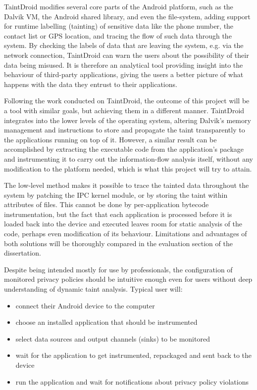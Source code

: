 \documentclass[12pt]{article}
\begin{document}
TaintDroid modifies several core parts of the Android platform, such as 
the Dalvik VM, the Android shared library, and even the file-system, 
adding support for runtime labelling (tainting) of sensitive data like the 
phone number, the contact list or GPS location, and tracing the flow of such 
data through the system. By checking the labels of data that are leaving the 
system, e.g. via the network connection, TaintDroid can warn the users about 
the possibility of their data being misused. It is therefore an analytical 
tool providing insight into the behaviour of third-party applications, giving 
the users a better picture of what happens with the data they entrust to 
their applications.

Following the work conducted on TaintDroid, the outcome of this project 
will be a tool with similar goals, but achieving them in a different 
manner. TaintDroid integrates into the lower levels of the operating 
system, altering Dalvik's memory management and instructions to store and
propagate the taint transparently to the applications running on top of 
it. However, a similar result can be accomplished by extracting the 
executable code from the application's package and instrumenting it to 
carry out the information-flow analysis itself, without any modification 
to the platform needed, which is what this project will try to attain.

The low-level method makes it possible to trace the tainted data 
throughout the system by patching the IPC kernel module, or by storing the 
taint within attributes of files. This cannot be done by per-application 
bytecode instrumentation, but the fact that each application is processed 
before it is loaded back into the device and executed leaves room for static 
analysis of the code, perhaps even modification of its behaviour. Limitations 
and advantages of both solutions will be thoroughly compared in the evaluation 
section of the dissertation.

Despite being intended mostly for use by professionals, the configuration 
of monitored privacy policies should be intuitive enough even for users 
without deep understanding of dynamic taint analysis. Typical user will:
\begin{itemize}
\item{connect their Android device to the computer}
\item{choose an installed application that should be instrumented}
\item{select data sources and output channels (sinks) to be monitored}
\item{wait for the application to get instrumented, repackaged and sent
      back to the device}
\item{run the application and wait for notifications about privacy policy
      violations}
\end{itemize}
\end{document}
